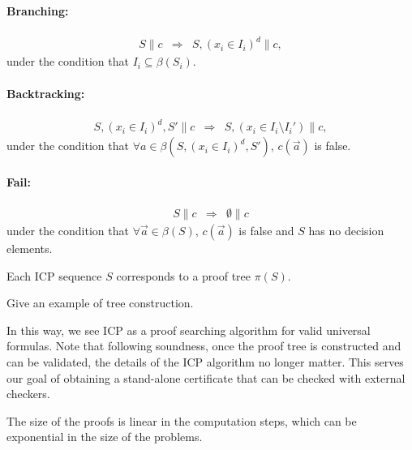 \documentclass[envcountsect]{llncs}
\begin{document}
\begin{definition}
\begin{mathpar}
  \end{mathpar}
  
  
\paragraph{Branching:}
\begin{eqnarray*}
S\parallel c &\Longrightarrow& S, (x_i\in I_i)^d \parallel c,
\end{eqnarray*}
under the condition that $I_i\subseteq \beta(S_i)$.

\paragraph{Backtracking:}
\begin{eqnarray*}
S, (x_i\in I_i)^d, S'\parallel c &\Longrightarrow& S, (x_i\in
I_i\setminus I_i') \parallel c,
\end{eqnarray*}
under the condition that $\forall a\in \beta(S, (x_i\in I_i)^d, S')$, $c(\vec
a)$
is false.

\paragraph{Fail:}
\begin{eqnarray*}
S\parallel c &\Longrightarrow& \emptyset \parallel c
\end{eqnarray*}
under the condition that $\forall \vec a\in \beta(S)$, $c(\vec a)$ is false and
 $S$ has no decision elements.

\end{definition}

\begin{theorem}[ST-Correspondence]
Each ICP sequence $S$ corresponds to a proof tree $\pi(S)$.
\end{theorem}

\begin{example}
Give an example of tree construction.
\end{example}

In this way, we see ICP as a proof searching algorithm for valid universal
formulas. Note that following soundness, once the proof tree is constructed and
can be validated, the details of the ICP algorithm no longer matter. This serves
our goal of obtaining a stand-alone certificate that can be checked with
external checkers.

\begin{proposition}
 The size of the proofs is linear in the computation steps, which can be
exponential in the size of the problems. 
\end{proposition}
\end{document}
